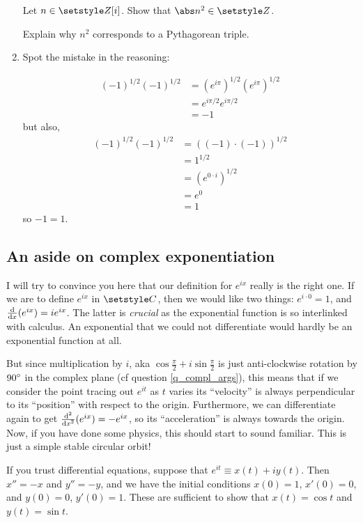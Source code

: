 \begin{enumerate}
  Let \(n \in \Integers[i]\). Show that \(\abs n^2 \in \Integers\).

  Explain why \(n^2\) corresponds to a Pythagorean triple.
 \item \label{q_comp_zw_exp}
  Spot the mistake in the reasoning:
  \begin{tcolorbox}
   \begin{align*}
    (-1)^{1/2} (-1)^{1/2}
     &= (e^{i\pi})^{1/2} (e^{i\pi})^{1/2} \\
     &= e^{i\pi/2} e^{i\pi/2} \\
     &= -1
   \end{align*}
   but also,
   \begin{align*}
    (-1)^{1/2} (-1)^{1/2}
     &= ((-1) \cdot (-1))^{1/2} \\
     &= 1^{1/2} \\
     &= (e^{0 \cdot i})^{1/2} \\
     &= e^0 \\
     &= 1
   \end{align*}
   so \(-1 = 1\).
  \end{tcolorbox}
\end{enumerate}

\subsection{An aside on complex exponentiation}

I will try to convince you here that our definition for \(e^{ix}\) really is the
right one. If we are to define \(e^{ix}\) in \(\Complex\), then we would like
two things: \(e^{i \cdot 0} = 1\), and \(\dv{x} (e^{ix}) = ie^{ix}\). The latter
is \emph{crucial} as the exponential function is so interlinked with calculus.
An exponential that we could not differentiate would hardly be an exponential
function at all.

But since multiplication by \(i\), aka
\(\cos \frac \pi 2 + i \sin \frac \pi 2\) is just anti-clockwise rotation by
\({90}^\circ\) in the complex plane (cf question \ref{q_compl_args}), this
means that if we consider the point tracing out \(e^{it}\) as \(t\) varies its
``velocity'' is always perpendicular to its ``position'' with respect to the
origin. Furthermore, we can differentiate again to get
\(\dv[2]{x} (e^{ix}) = -e^{ix}\), so its ``acceleration'' is always towards the
origin. Now, if you have done some physics, this should start to sound familiar.
This is just a simple stable circular orbit!

If you trust differential equations, suppose that
\(e^{it} \equiv x(t) + i y(t)\). Then \(x'' = -x\) and \(y'' = -y\), and we have
the initial conditions \(x(0) = 1\), \(x'(0) = 0\), and \(y(0) = 0\),
\(y'(0) = 1\). These are sufficient to show that
\(x(t) = \cos t\) and \(y(t) = \sin t\).

